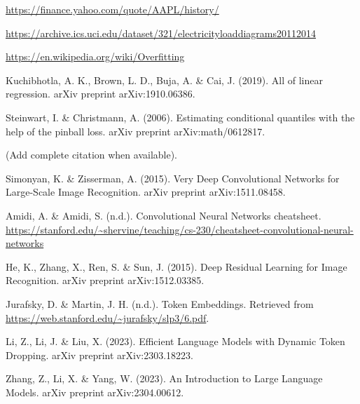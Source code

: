 
\begin{thebibliography}{99}


	 \url{https://finance.yahoo.com/quote/AAPL/history/}

	 \url{https://archive.ics.uci.edu/dataset/321/electricityloaddiagrams20112014}

	 \url{https://en.wikipedia.org/wiki/Overfitting}


	 Kuchibhotla, A. K., Brown, L. D., Buja, A. \& Cai, J. (2019). All of linear regression. arXiv preprint arXiv:1910.06386.

	 Steinwart, I. \& Christmann, A. (2006). Estimating conditional quantiles with the help of the pinball loss. arXiv preprint arXiv:math/0612817.

	 (Add complete citation when available).

	 Simonyan, K. \& Zisserman, A. (2015). Very Deep Convolutional Networks for Large-Scale Image Recognition. arXiv preprint arXiv:1511.08458.

	 Amidi, A. \& Amidi, S. (n.d.). Convolutional Neural Networks cheatsheet. \url{https://stanford.edu/~shervine/teaching/cs-230/cheatsheet-convolutional-neural-networks}

	 He, K., Zhang, X., Ren, S. \& Sun, J. (2015). Deep Residual Learning for Image Recognition. arXiv preprint arXiv:1512.03385.

	 Jurafsky, D. \& Martin, J. H. (n.d.). Token Embeddings. Retrieved from \url{https://web.stanford.edu/~jurafsky/slp3/6.pdf}.

	 Li, Z., Li, J. \& Liu, X. (2023). Efficient Language Models with Dynamic Token Dropping. arXiv preprint arXiv:2303.18223.

	 Zhang, Z., Li, X. \& Yang, W. (2023). An Introduction to Large Language Models. arXiv preprint arXiv:2304.00612.


\end{thebibliography}
